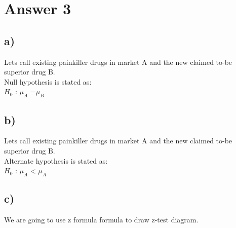 \documentclass[12pt]{article}
\begin{document}
\section*{Answer 3}

\subsection*{a)}
Lets call existing painkiller drugs in market A and the new claimed to-be superior drug B. \\
Null hypothesis is stated as: \\
$H_0$ : $\mu_A$ =$\mu_B$\\

\subsection*{b)}
Lets call existing painkiller drugs in market A and the new claimed to-be superior drug B. \\
Alternate hypothesis is stated as: \\
$H_0$ : $\mu_A$ < $\mu_A$\\

\subsection*{c)}

We are going to use z formula formula to draw z-test diagram.\\
\end{document}
